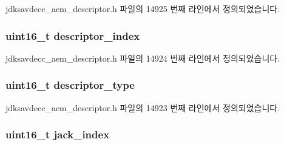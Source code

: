 jdksavdecc\+\_\+aem\+\_\+descriptor.\+h 파일의 14925 번째 라인에서 정의되었습니다.

\subsubsection[{\texorpdfstring{descriptor\+\_\+index}{descriptor_index}}]{\setlength{\rightskip}{0pt plus 5cm}uint16\+\_\+t descriptor\+\_\+index}\hypertarget{structjdksavdecc__descriptor__external__port_a042bbc76d835b82d27c1932431ee38d4}{}\label{structjdksavdecc__descriptor__external__port_a042bbc76d835b82d27c1932431ee38d4}


jdksavdecc\+\_\+aem\+\_\+descriptor.\+h 파일의 14924 번째 라인에서 정의되었습니다.

\subsubsection[{\texorpdfstring{descriptor\+\_\+type}{descriptor_type}}]{\setlength{\rightskip}{0pt plus 5cm}uint16\+\_\+t descriptor\+\_\+type}\hypertarget{structjdksavdecc__descriptor__external__port_ab7c32b6c7131c13d4ea3b7ee2f09b78d}{}\label{structjdksavdecc__descriptor__external__port_ab7c32b6c7131c13d4ea3b7ee2f09b78d}


jdksavdecc\+\_\+aem\+\_\+descriptor.\+h 파일의 14923 번째 라인에서 정의되었습니다.

\subsubsection[{\texorpdfstring{jack\+\_\+index}{jack_index}}]{\setlength{\rightskip}{0pt plus 5cm}uint16\+\_\+t jack\+\_\+index}\hypertarget{structjdksavdecc__descriptor__external__port_ab21cbae1a33ecc3062208bee181c262f}{}\label{structjdksavdecc__descriptor__external__port_ab21cbae1a33ecc3062208bee181c262f}


